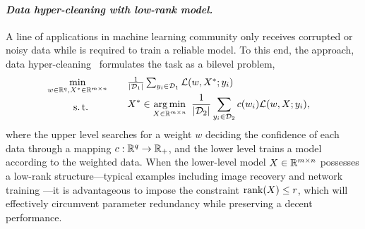 \paragraph{\emph{\textbf{Data hyper-cleaning with low-rank model.}}} A line of applications in machine learning community only receives corrupted or noisy data while is required to train a reliable model. To this end, the approach, data hyper-cleaning~\cite{shaban2019truncated} formulates the task as a bilevel problem, 
\begin{equation*}
\begin{array}{cl}
         \min\limits_{w\in\mbR^q, X^*\in\mbRmn}\ \ & \ \frac{1}{\left|\mathcal{D}_1\right|} \sum_{y_i \in \mathcal{D}_{1}} \lanifold(w,X^*;y_i) 
         \\[2mm]
         \mathrm{s.\,t.}&\ 
        \begin{aligned}
            X^* &\in \argmin_{X\in\mbRmn}\ \frac{1}{\left|\mathcal{D}_{2}\right|} \sum_{y_i \in \mathcal{D}_{2}} c(w_i) \lanifold(w, X; y_i),
        \end{aligned}
\end{array}
\end{equation*}
where the upper level searches for a weight $w$ deciding the confidence of each data through a mapping $c:\mathbb{R}^q\to\mathbb{R}_+$, and the lower level trains a model according to the weighted data. When the lower-level model $X\in\mathbb{R}^{m\times n}$ possesses a low-rank structure---typical examples including image recovery \cite{zhang2013hyperspectral,wang2017reweighted} and network training \cite{idelbayev2020lowrankcompress,yaras2024compressible}---it is advantageous to impose the constraint $\operatorname{rank}(X)\le r$, which will effectively circumvent parameter redundancy while preserving a decent performance.

